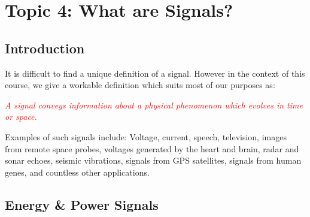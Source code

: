 \documentclass[../notes-main.tex]{subfiles}
\begin{document}
\section{Topic 4: What are Signals?}
\subsection{Introduction}
It is difficult to find a unique definition of a signal. However in the context of this course, we give a workable definition which suits most of our purposes as:

\begin{mdframed}
    \begin{center}
        \textcolor{red}{%
            \emph{A signal conveys information about a physical phenomenon which evolves in time or space.}}
    \end{center}
\end{mdframed}\label{fig:signal-def-1}
\noindent Examples of such signals include: Voltage, current, speech, television, images from remote space probes, voltages generated by the heart and brain, radar and sonar echoes, seismic vibrations, signals from GPS satellites, signals from human genes, and countless other applications.
\subsection{Energy \& Power Signals}
\end{document}
